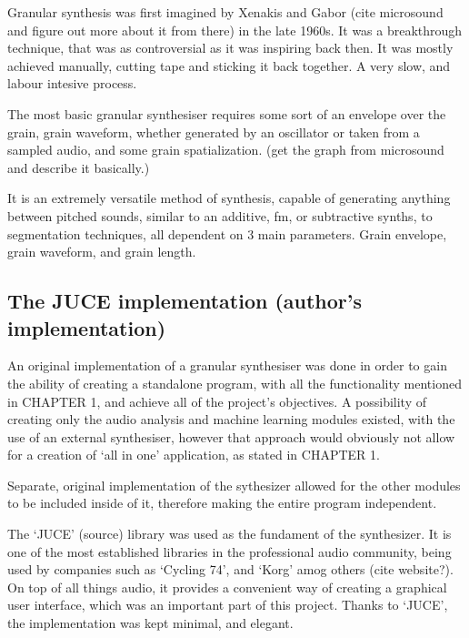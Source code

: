 Granular synthesis was first imagined by Xenakis and Gabor (cite
microsound and figure out more about it from there) in the late
1960s. It was a breakthrough technique, that was as controversial as
it was inspiring back then. It was mostly achieved manually, cutting
tape and sticking it back together. A very slow, and labour intesive
process.

The most basic granular synthesiser requires some sort of an envelope
over the grain, grain waveform, whether generated by an oscillator or
taken from a sampled audio, and some grain spatialization. (get the
graph from microsound and describe it basically.) 

It is an extremely versatile method of synthesis, capable of
generating anything between pitched sounds, similar to an additive,
fm, or subtractive synths, to segmentation techniques, all dependent
on 3 main parameters. Grain envelope, grain waveform, and grain
length.


\subsection{The JUCE implementation (author's implementation)}

An original implementation of a granular synthesiser was done in order
to gain the ability of creating a standalone program, with all the
functionality mentioned in CHAPTER 1, and achieve all of the project's
objectives. A possibility of creating only the audio analysis and
machine learning modules existed, with the use of an external
synthesiser, however that approach would obviously not allow for a
creation of `all in one' application, as stated in CHAPTER 1.

Separate, original implementation of the sythesizer allowed for the other
modules to be included inside of it, therefore making the entire
program independent.

The `JUCE' (source) library was used as the fundament of the
synthesizer.  It is one of the most established libraries in the
professional audio community, being used by companies such as `Cycling
74', and `Korg' amog others (cite website?). On top of all things
audio, it provides a convenient way of creating a graphical user
interface, which was an important part of this project. Thanks to
`JUCE', the implementation was kept minimal, and elegant.

